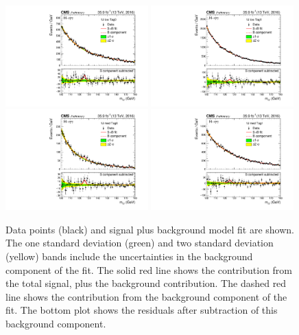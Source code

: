 \begin{figure}[hptb]
  \centering
  \includegraphics[width=0.49\textwidth]{Figures/Appendices/_forAppendix2016ch1_RECO_1J_PTH_0_60_Tag0_13TeV.pdf}
  \includegraphics[width=0.49\textwidth]{Figures/Appendices/_forAppendix2016ch1_RECO_1J_PTH_0_60_Tag1_13TeV.pdf}
  \includegraphics[width=0.49\textwidth]{Figures/Appendices/_forAppendix2016ch1_RECO_1J_PTH_60_120_Tag0_13TeV.pdf}
  \includegraphics[width=0.49\textwidth]{Figures/Appendices/_forAppendix2016ch1_RECO_1J_PTH_60_120_Tag1_13TeV.pdf}
  \caption[Signal plus background fits to data.]
  {
    Data points (black) and signal plus background model fit are shown. 
    The one standard deviation (green) and two standard deviation (yellow) bands 
    include the uncertainties in the background component of the fit. 
    The solid red line shows the contribution from the total signal, plus the background contribution. 
    The dashed red line shows the contribution from the background component of the fit. 
    The bottom plot shows the residuals after subtraction of this background component.
  }
\end{figure}


